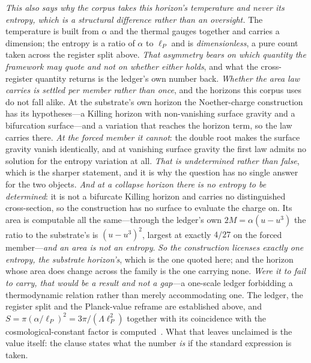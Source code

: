 \documentclass[11pt,a4paper]{article}
\theoremstyle{definition}
\begin{document}
\emph{This also says why the corpus takes this horizon's temperature and never its entropy, which is a
structural difference rather than an oversight.} The temperature is built from
$\alpha$ and the thermal gauges together and carries a dimension; the entropy is a ratio of $\alpha$ to
$\ell_P$ and is \emph{dimensionless}, a pure count taken across the register split above. \emph{That
asymmetry bears on which quantity the framework may quote and not on whether either holds}, and what the
cross-register quantity returns is the ledger's own number back.
\emph{Whether the area law carries is settled per member rather than once}, and the horizons this
corpus uses do not fall alike. At the substrate's own horizon the Noether-charge construction has its
hypotheses---a Killing horizon with non-vanishing surface gravity and a bifurcation surface---and a variation
that reaches the horizon term, so the law carries there. \emph{At the forced member it cannot}: the double
root makes the surface gravity vanish identically, and at vanishing surface gravity the first law admits no
solution for the entropy variation at all. \emph{That is undetermined rather than false}, which is the
sharper statement, and it is why the question has no single answer for the two objects.
\emph{And at a collapse horizon there is no entropy to be determined}: it is not a bifurcate Killing horizon
and carries no distinguished cross-section, so the construction has no surface to evaluate the charge on. Its
area is computable all the same---through the ledger's own $2M=\alpha(u-u^{3})$ the ratio to the substrate's
is $(u-u^{3})^{2}$, largest at exactly $4/27$ on the forced member---\emph{and an area is not an
entropy}.
\emph{So the construction licenses exactly one entropy, the substrate horizon's}, which is the one quoted
here; and the horizon whose area does change across the family is the one carrying none. \emph{Were it to fail to carry, that
would be a result and not a gap}---a one-scale ledger forbidding a thermodynamic relation rather than
merely accommodating one. The ledger, the register split and the Planck-value reframe are
established above, and $S=\pi(\alpha/\ell_P)^2=3\pi/(\Lambda\ell_P^2)$ together with its coincidence
with the cosmological-constant factor is
computed~.
What that leaves unclaimed is the value itself: the clause states what the number \emph{is} if the standard expression is taken.
\end{document}
